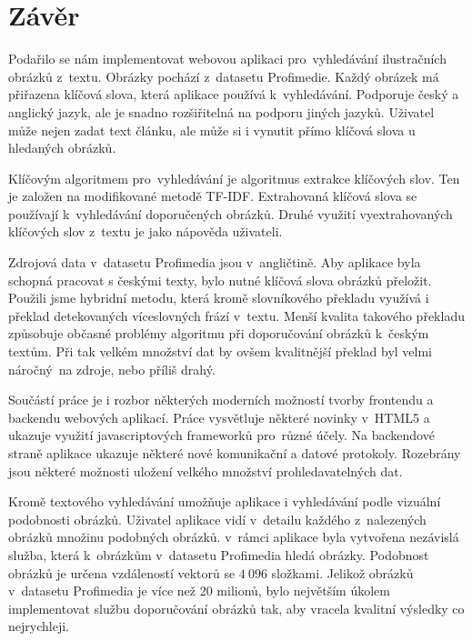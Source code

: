 \chapter{Závěr}

Podařilo se nám implementovat webovou aplikaci pro~vyhledávání ilustračních obrázků z~textu. Obrázky pochází z~datasetu Profimedie. Každý obrázek má přiřazena klíčová slova, která aplikace používá k~vyhledávání. Podporuje český a anglický jazyk, ale je snadno rozšiřitelná na podporu jiných jazyků. Uživatel může nejen zadat text článku, ale může si i vynutit přímo klíčová slova u hledaných obrázků.

Klíčovým algoritmem pro~vyhledávání je algoritmus extrakce klíčových slov. Ten je založen na modifikované metodě TF-IDF. Extrahovaná klíčová slova se používají k~vyhledávání doporučených obrázků. Druhé využití vyextrahovaných klíčových slov z~textu je jako nápověda uživateli.

Zdrojová data v~datasetu Profimedia jsou v~angličtině. Aby aplikace byla schopná pracovat s českými texty, bylo nutné klíčová slova obrázků přeložit. Použili jsme hybridní metodu, která kromě slovníkového překladu využívá i překlad detekovaných víceslovných frází v~textu. Menší kvalita takového překladu způsobuje občasné problémy algoritmu při doporučování obrázků k~českým textům. Při tak velkém množství dat by ovšem kvalitnější překlad byl velmi náročný~na zdroje, nebo příliš drahý.

Součástí práce je i rozbor některých moderních možností tvorby frontendu a backendu webových aplikací. Práce vysvětluje některé novinky v~HTML5 a ukazuje využití javascriptových frameworků pro~různé účely. Na backendové straně aplikace ukazuje některé nové komunikační a datové protokoly. Rozebrány jsou některé možnosti uložení velkého množství prohledavatelných dat.

Kromě textového vyhledávání umožňuje aplikace i vyhledávání podle vizuální podobnosti obrázků. Uživatel aplikace vidí v~detailu každého z~nalezených obrázků množinu podobných obrázků. v~rámci aplikace byla vytvořena nezávislá služba, která k~obrázkům v~datasetu Profimedia hledá obrázky. Podobnost obrázků je určena vzdáleností vektorů se $4\ 096$ složkami. Jelikož obrázků v~datasetu Profimedia je více než 20 milionů, bylo největším úkolem implementovat službu doporučování obrázků tak, aby vracela kvalitní výsledky co nejrychleji.


